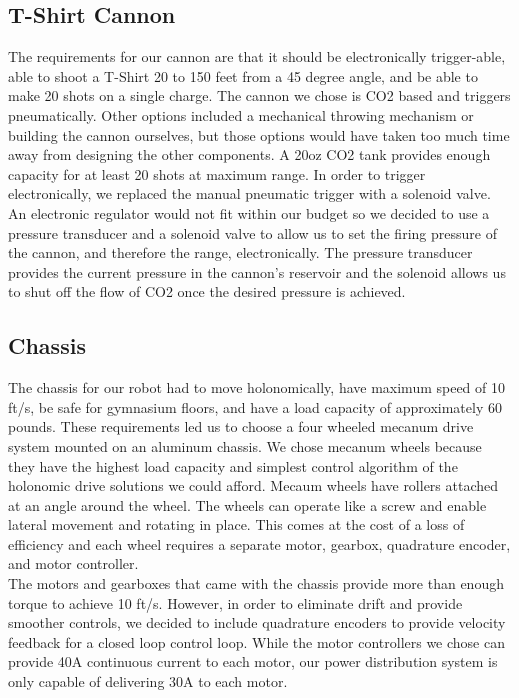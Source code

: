 \documentclass[letterpaper,12pt]{article}
\begin{document}
\subsection{T-Shirt Cannon}
The requirements for our cannon are that it should be electronically trigger-able, able to shoot a T-Shirt 20 to 150 feet from a 45 degree angle, and be able to make 20 shots on a single charge. The cannon we chose is CO2 based and triggers pneumatically. Other options included a mechanical throwing mechanism or building the cannon ourselves, but those options would have taken too much time away from designing the other components. A 20oz CO2 tank provides enough capacity for at least 20 shots at maximum range. In order to trigger electronically, we replaced the manual pneumatic trigger with a solenoid valve. An electronic regulator would not fit within our budget so we decided to use a pressure transducer and a solenoid valve to allow us to set the firing pressure of the cannon, and therefore the range, electronically. The pressure transducer provides the current pressure in the cannon’s reservoir and the solenoid allows us to shut off the flow of CO2 once the desired pressure is achieved.\\ 
\subsection{Chassis}
The chassis for our robot had to move holonomically, have maximum speed of 10 ft/s, be safe for gymnasium floors, and have a load capacity of approximately 60 pounds. These requirements led us to choose a four wheeled mecanum drive system mounted on an aluminum chassis. We chose mecanum wheels because they have the highest load capacity and simplest control algorithm of the holonomic drive solutions we could afford. Mecaum wheels have rollers attached at an angle around the wheel. The wheels can operate like a screw and enable lateral movement and rotating in place. This comes at the cost of a loss of efficiency and each wheel requires a separate motor, gearbox, quadrature encoder, and motor controller. \\
The motors and gearboxes that came with the chassis provide more than enough torque to achieve 10 ft/s. However, in order to eliminate drift and provide smoother controls, we decided to include quadrature encoders to provide velocity feedback for a closed loop control loop. While the motor controllers we chose can provide 40A continuous current to each motor, our power distribution system is only capable of delivering 30A to each motor.\\
\end{document}
